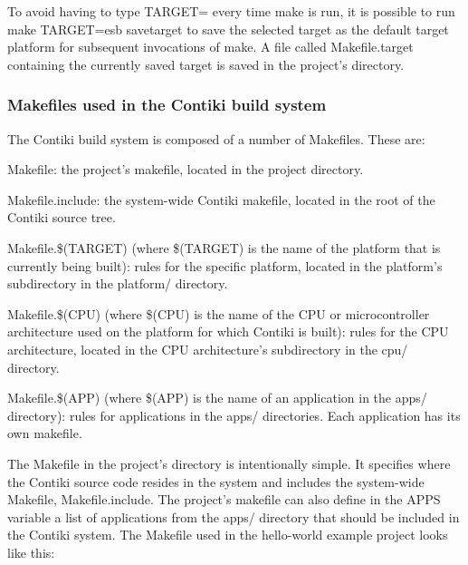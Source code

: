 \-To avoid having to type {\ttfamily \-T\-A\-R\-G\-E\-T=} every time {\ttfamily make} is run, it is possible to run {\ttfamily make \-T\-A\-R\-G\-E\-T=esb savetarget} to save the selected target as the default target platform for subsequent invocations of {\ttfamily make}. \-A file called {\ttfamily \-Makefile.\-target} containing the currently saved target is saved in the project's directory.\hypertarget{a00044_buildsystem-makefiles}{}\subsubsection{\-Makefiles used in the Contiki build system}\label{a00044_buildsystem-makefiles}
\-The \-Contiki build system is composed of a number of \-Makefiles. \-These are\-:
\begin{DoxyItemize}
\item {\ttfamily \-Makefile}\-: the project's makefile, located in the project directory.
\item {\ttfamily \-Makefile.\-include}\-: the system-\/wide \-Contiki makefile, located in the root of the \-Contiki source tree.
\item {\ttfamily \-Makefile.\$(\-T\-A\-R\-G\-E\-T)} (where \$(\-T\-A\-R\-G\-E\-T) is the name of the platform that is currently being built)\-: rules for the specific platform, located in the platform's subdirectory in the platform/ directory.
\item {\ttfamily \-Makefile.\$(\-C\-P\-U)} (where \$(\-C\-P\-U) is the name of the \-C\-P\-U or microcontroller architecture used on the platform for which \-Contiki is built)\-: rules for the \-C\-P\-U architecture, located in the \-C\-P\-U architecture's subdirectory in the cpu/ directory.
\item {\ttfamily \-Makefile.\$(\-A\-P\-P)} (where \$(\-A\-P\-P) is the name of an application in the apps/ directory)\-: rules for applications in the apps/ directories. \-Each application has its own makefile.
\end{DoxyItemize}

\-The \-Makefile in the project's directory is intentionally simple. \-It specifies where the \-Contiki source code resides in the system and includes the system-\/wide \-Makefile, {\ttfamily \-Makefile.\-include}. \-The project's makefile can also define in the {\ttfamily \-A\-P\-P\-S} variable a list of applications from the apps/ directory that should be included in the \-Contiki system. \-The \-Makefile used in the hello-\/world example project looks like this\-:


